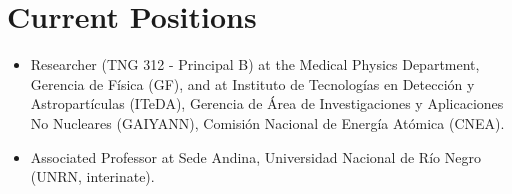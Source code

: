 \ifeng
\section*{Current Positions}
\begin{itemize}
    \item Researcher (TNG 312 - Principal B) at the Medical Physics Department, Gerencia de Física (GF), and at Instituto de Tecnologías en Detección y Astropartículas (ITeDA), Gerencia de Área de Investigaciones y Aplicaciones No Nucleares (GAIYANN), Comisión Nacional de Energía Atómica (CNEA).
  \item Associated Professor at Sede Andina, Universidad Nacional de Río Negro (UNRN, interinate).
\end{itemize}
\else
